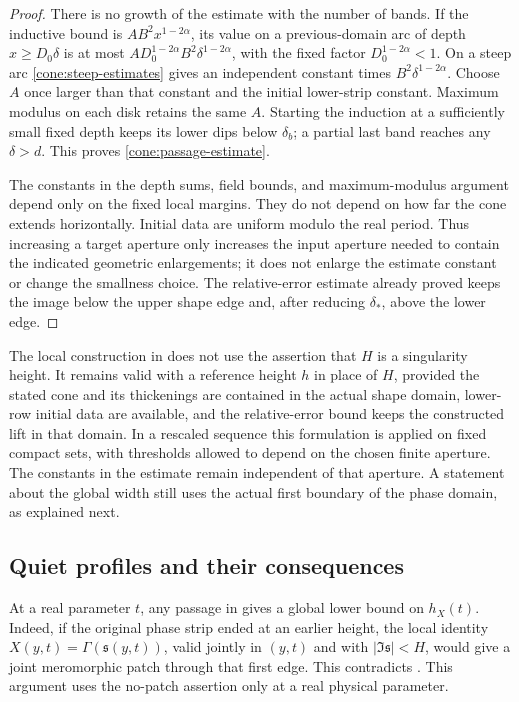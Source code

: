 \begin{proof}
There is no growth of the estimate with the number of bands. If the
inductive bound is \(A B^2x^{1-2\alpha}\), its value on a previous-domain
arc of depth \(x\ge D_0\delta\) is at most
\(A D_0^{1-2\alpha}B^2\delta^{1-2\alpha}\), with the fixed factor
\(D_0^{1-2\alpha}<1\). On a steep arc
\eqref{cone:steep-estimates} gives an independent constant times
\(B^2\delta^{1-2\alpha}\). Choose \(A\) once larger than that constant
and the initial lower-strip constant. Maximum modulus on each disk
retains the same \(A\). Starting the induction at a sufficiently small
fixed depth keeps its lower dips below \(\delta_b\); a partial last
band reaches any \(\delta>d\). This proves
\eqref{cone:passage-estimate}.

The constants in the depth sums, field bounds, and maximum-modulus
argument depend only on the fixed local margins. They do not depend
on how far the cone extends horizontally. Initial data are uniform
modulo the real period. Thus increasing a target aperture only
increases the input aperture needed to contain the indicated
geometric enlargements; it does not enlarge the estimate constant or
change the smallness choice. The relative-error estimate already
proved keeps the image below the upper shape edge and, after reducing
\(\delta_*\), above the lower edge.
\end{proof}

\begin{remark}\label{cone:reference-height}
The local construction in  does not use the assertion that
\(H\) is a singularity height. It remains valid with a reference height
\(h\) in place of \(H\), provided the stated cone and its thickenings
are contained in the actual shape domain, lower-row initial data are
available, and the relative-error bound keeps the constructed lift in
that domain. In a rescaled sequence this formulation is applied on
fixed compact sets, with thresholds allowed to depend on the chosen
finite aperture. The constants in the estimate remain independent of
that aperture. A statement about the global width still uses the
actual first boundary of the phase domain, as explained next.
\end{remark}

\subsection{Quiet profiles and their consequences}

At a real parameter \(t\), any passage in  gives a global
lower bound on \(h_X(t)\). Indeed, if the original phase strip ended at
an earlier height, the local identity
\(X(y,t)=\Gamma(\mathfrak s(y,t))\), valid jointly in \((y,t)\) and with
\(|\Im\mathfrak s|<H\), would give a joint meromorphic patch through
that first edge. This contradicts . This argument
uses the no-patch assertion only at a real physical parameter.

